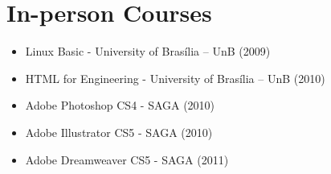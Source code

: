 \section{In-person Courses}
\begin{itemize}
    \item Linux Basic - University of Brasília – UnB (2009)
    \item HTML for Engineering - University of Brasília – UnB (2010)
    \item Adobe Photoshop CS4 - SAGA (2010)
    \item Adobe Illustrator CS5 - SAGA (2010)
    \item Adobe Dreamweaver CS5 - SAGA (2011)
\end{itemize}
